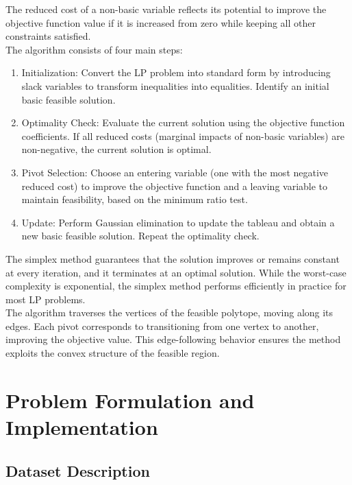 \documentclass[10pt]{article}
\begin{document}
The reduced cost of a non-basic variable reflects its potential to improve the objective function value if it is increased from zero while keeping all other constraints satisfied.\\


The algorithm consists of four main steps:

\begin{enumerate}
    \item Initialization: Convert the LP problem into standard form by introducing slack variables to transform inequalities into equalities. Identify an initial basic feasible solution.
    \item Optimality Check: Evaluate the current solution using the objective function coefficients. If all reduced costs (marginal impacts of non-basic variables) are non-negative, the current solution is optimal.
    \item Pivot Selection: Choose an entering variable (one with the most negative reduced cost) to improve the objective function and a leaving variable to maintain feasibility, based on the minimum ratio test.
    \item Update: Perform Gaussian elimination to update the tableau and obtain a new basic feasible solution. Repeat the optimality check.
\end{enumerate}


The simplex method guarantees that the solution improves or remains constant at every iteration, and it terminates at an optimal solution. While the worst-case complexity is exponential, the simplex method performs efficiently in practice for most LP problems.\\

The algorithm traverses the vertices of the feasible polytope, moving along its edges. Each pivot corresponds to transitioning from one vertex to another, improving the objective value. This edge-following behavior ensures the method exploits the convex structure of the feasible region.\\


\section{Problem Formulation and Implementation}

\subsection{Dataset Description}
\end{document}
